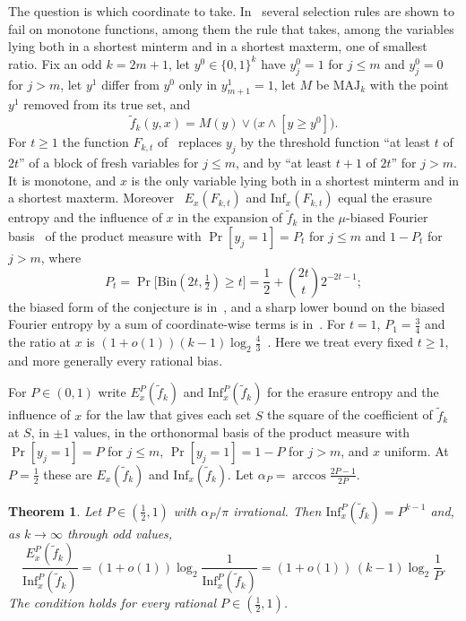 \documentclass[11pt]{amsart}
\newtheorem{theorem}{Theorem}
\theoremstyle{remark}
\newcommand{\Inf}{\mathrm{Inf}}
\newcommand{\MAJ}{\mathrm{MAJ}}
\begin{document}
The question is which coordinate to take. In~\cite{Shm8} several selection rules are shown to fail on monotone
functions, among them the rule that takes, among the variables lying both in a shortest minterm and in a shortest
maxterm, one of smallest ratio. Fix an odd $k=2m+1$, let $y^0\in\{0,1\}^k$ have $y^0_j=1$ for $j\le m$ and
$y^0_j=0$ for $j>m$, let $y^1$ differ from $y^0$ only in $y^1_{m+1}=1$, let $M$ be $\MAJ_k$ with the point $y^1$ removed from its true set, and
\[
\tilde f_k(y,x)=M(y)\vee\bigl(x\wedge[y\ge y^0]\bigr).
\]
For $t\ge1$ the function $F_{k,t}$ of~\cite[Section~5]{Shm8} replaces $y_j$ by the threshold function ``at least $t$
of $2t$'' of a block of fresh variables for $j\le m$, and by ``at least $t+1$ of $2t$'' for $j>m$. It is monotone, and
$x$ is the only variable lying both in a shortest minterm and in a shortest maxterm. Moreover~\cite[proof of
Proposition~12]{Shm8} $E_x(F_{k,t})$ and $\Inf_x(F_{k,t})$ equal the erasure entropy and the influence of $x$ in the
expansion of $\tilde f_k$ in the $\mu$-biased Fourier basis~\cite[Chapter~8]{OD14} of the product measure with
$\Pr[y_j=1]=P_t$ for $j\le m$ and $1-P_t$ for $j>m$, where
\[
P_t=\Pr\bigl[\mathrm{Bin}(2t,\tfrac12)\ge t\bigr]=\frac12+\binom{2t}{t}2^{-2t-1};
\]
the biased form of the conjecture is in~\cite{KMS12}, and a sharp lower bound on the biased Fourier entropy by a
sum of coordinate-wise terms is in~\cite{Cha25}. For $t=1$, $P_1=\frac34$ and the ratio at $x$ is
$(1+o(1))(k-1)\log_2\frac43$~\cite{Shm9}. Here we treat every fixed $t\ge1$, and more generally every rational bias.

For $P\in(0,1)$ write $E_x^P(\tilde f_k)$ and $\Inf_x^P(\tilde f_k)$ for the erasure entropy and the influence of $x$
for the law that gives each set $S$ the square of the coefficient of $\tilde f_k$ at $S$, in $\pm1$ values, in the orthonormal basis of
the product measure with $\Pr[y_j=1]=P$ for $j\le m$, $\Pr[y_j=1]=1-P$ for $j>m$, and $x$ uniform. At $P=\frac12$
these are $E_x(\tilde f_k)$ and $\Inf_x(\tilde f_k)$. Let $\alpha_P=\arccos\frac{2P-1}{2P}$.

\begin{theorem}\label{thm:bias}
Let $P\in(\frac12,1)$ with $\alpha_P/\pi$ irrational. Then $\Inf_x^P(\tilde f_k)=P^{k-1}$ and, as $k\to\infty$ through
odd values,
\[
\frac{E_x^P(\tilde f_k)}{\Inf_x^P(\tilde f_k)}=(1+o(1))\log_2\frac1{\Inf_x^P(\tilde f_k)}=(1+o(1))\,(k-1)\log_2\frac1P .
\]
The condition holds for every rational $P\in(\frac12,1)$.
\end{theorem}
\end{document}
